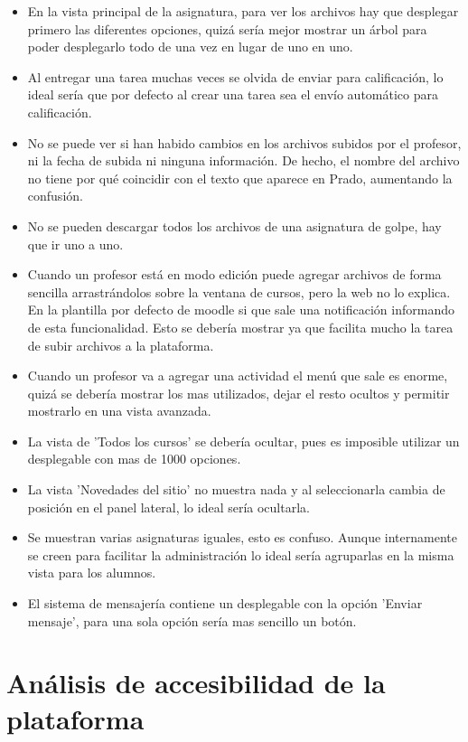 \begin{itemize}
\item En la vista principal de la asignatura, para ver los archivos hay que desplegar primero las diferentes opciones, quizá sería mejor mostrar un árbol para poder desplegarlo todo de una vez en lugar de uno en uno.
\item Al entregar una tarea muchas veces se olvida de enviar para calificación, lo ideal sería que por defecto al crear una tarea sea el envío automático para calificación.
\item No se puede ver si han habido cambios en los archivos subidos por el profesor, ni la fecha de subida ni ninguna información. De hecho, el nombre del archivo no tiene por qué coincidir con el texto que aparece en Prado, aumentando la confusión.
\item No se pueden descargar todos los archivos de una asignatura de golpe, hay que ir uno a uno.
\item Cuando un profesor está en modo edición puede agregar archivos de forma sencilla arrastrándolos sobre la ventana de cursos, pero la web no lo explica. En la plantilla por defecto de moodle si que sale una notificación informando de esta funcionalidad. Esto se debería mostrar ya que facilita mucho la tarea de subir archivos a la plataforma.
\item Cuando un profesor va a agregar una actividad el menú que sale es enorme, quizá se debería mostrar los mas utilizados, dejar el resto ocultos y permitir mostrarlo en una vista avanzada.
\item La vista de 'Todos los cursos' se debería ocultar, pues es imposible utilizar un desplegable con mas de 1000 opciones.
\item La vista 'Novedades del sitio' no muestra nada y al seleccionarla cambia de posición en el panel lateral, lo ideal sería ocultarla.
\item Se muestran varias asignaturas iguales, esto es confuso. Aunque internamente se creen para facilitar la administración lo ideal sería agruparlas en la misma vista para los alumnos.
\item El sistema de mensajería contiene un desplegable con la opción 'Enviar mensaje', para una sola opción sería mas sencillo un botón.

\end{itemize}

\section{Análisis de accesibilidad de la plataforma}

